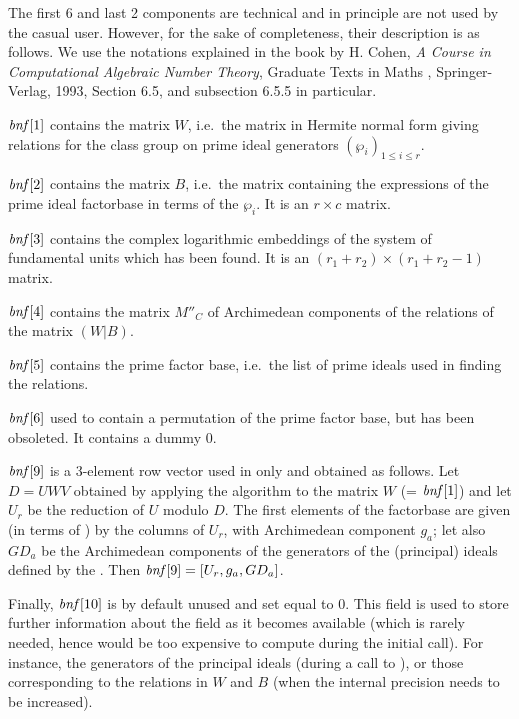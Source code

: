 \noindent \item The first 6 and last 2 components are technical and in
principle are not used by the casual user. However, for the sake of
completeness, their description is as follows. We use the notations explained
in the book by H. Cohen, \emph{A Course in Computational Algebraic Number
Theory}, Graduate Texts in Maths , Springer-Verlag, 1993, Section
6.5, and subsection 6.5.5 in particular.

$\hbox{\it bnf\/}[1]$ contains the matrix $W$, i.e.~the matrix in Hermite normal
form giving relations for the class group on prime ideal generators
$(\wp_i)_{1\le i\le r}$.

$\hbox{\it bnf\/}[2]$ contains the matrix $B$, i.e.~the matrix containing the
expressions of the prime ideal factorbase in terms of the $\wp_i$. It is an
$r\times c$ matrix.

$\hbox{\it bnf\/}[3]$ contains the complex logarithmic embeddings of the system of
fundamental units which has been found. It is an $(r_1+r_2)\times(r_1+r_2-1)$
matrix.

$\hbox{\it bnf\/}[4]$ contains the matrix $M''_C$ of Archimedean components of the
relations of the matrix $(W|B)$.

$\hbox{\it bnf\/}[5]$ contains the prime factor base, i.e.~the list of prime
ideals used in finding the relations.

$\hbox{\it bnf\/}[6]$ used to contain a permutation of the prime factor base, but
has been obsoleted. It contains a dummy $0$.

$\hbox{\it bnf\/}[9]$ is a 3-element row vector used in  only
and obtained as follows. Let $D = U W V$ obtained by applying the
 algorithm to the matrix $W$ (= $\hbox{\it bnf\/}[1]$) and
let $U_r$ be the reduction of $U$ modulo $D$. The first elements of the
factorbase are given (in terms of ) by the columns of $U_r$,
with Archimedean component $g_a$; let also $GD_a$ be the Archimedean
components of the generators of the (principal) ideals defined by the
. Then $\hbox{\it bnf\/}[9]=[U_r, g_a, GD_a]$.

Finally, $\hbox{\it bnf\/}[10]$ is by default unused and set equal to 0. This
field is used to store further information about the field as it becomes
available (which is rarely needed, hence would be too expensive to compute
during the initial  call). For instance, the generators of the
principal ideals  (during a call to
), or those corresponding to the relations in $W$ and
$B$ (when the  internal precision needs to be increased).
\smallskip

